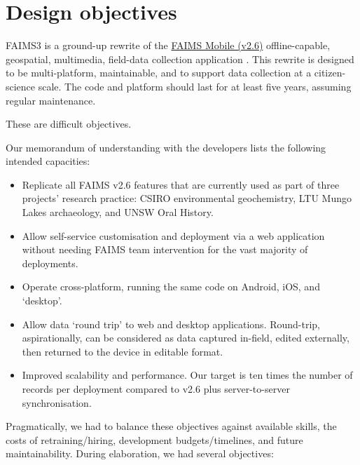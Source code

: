 \documentclass[a4paper,headings=small fontsize=10pt]{scrreprt}
\begin{document}


\tableofcontents


\chapter{Design objectives}

FAIMS3 is a ground-up rewrite of the
\href{https://github.com/FAIMS}{{FAIMS Mobile (v2.6)}} offline-capable,
geospatial, multimedia, field-data collection application
\autocite{Ballsun-Stanton2018-hq}. This rewrite is designed to be multi-platform, maintainable, and
to support data collection at a citizen-science scale. The code and
platform should last for at least five years, assuming regular
maintenance.

These are difficult objectives.

Our memorandum of understanding with the developers lists the following
intended capacities:

\begin{itemize}
\item Replicate all FAIMS v2.6 features that are currently used as part of
  three projects' research practice: CSIRO environmental geochemistry,
  LTU Mungo Lakes archaeology, and UNSW Oral History.
 
\item Allow self-service customisation and deployment via a web application
  without needing FAIMS team intervention for the vast majority of
  deployments.
 
\item Operate cross-platform, running the same code on Android, iOS, and
  `desktop'.
 
\item Allow data `round trip' to web and desktop applications. Round-trip,
  aspirationally, can be considered as data captured in-field, edited
  externally, then returned to the device in editable format.
 
\item Improved scalability and performance. Our target is ten times the
  number of records per deployment compared to v2.6 plus
  server-to-server synchronisation.
 
\end{itemize}

Pragmatically, we had to balance these objectives against available
skills, the costs of retraining/hiring, development budgets/timelines,
and future maintainability. During elaboration, we had several
objectives:
\end{document}
